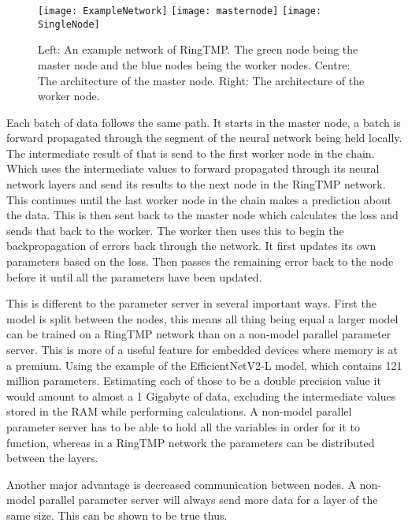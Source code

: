 \begin{figure}[h]
    \texttt{[image: ExampleNetwork]}
    \texttt{[image: masternode]}
    \texttt{[image: SingleNode]}
    \caption{Left: An example network of RingTMP. The green node being the
            master node and the blue nodes being the worker nodes. Centre: The
            architecture of the master node. Right: The architecture of the
            worker node.}
\end{figure}

Each batch of data follows the same path. It starts in the master node, a batch
is forward propagated through the segment of the neural network being held
locally. The intermediate result of that is send to the first worker node in the
chain. Which uses the intermediate values to forward propagated through its
neural network layers and send its results to the next node in the RingTMP
network. This continues until the last worker node in the chain makes a
prediction about the data. This is then sent back to the master node which
calculates the loss and sends that back to the worker. The worker then uses this
to begin the backpropagation of errors back through the network. It first
updates its own parameters based on the loss. Then passes the remaining
error back to the node before it until all the parameters have been updated.

This is different to the parameter server in several important ways. First the
model is split between the nodes, this means all thing being equal a larger
model can be trained on a RingTMP network than on a non-model parallel parameter
server. This is more of a useful feature for embedded devices where memory is at
a premium. Using the example of the EfficientNetV2-L model, which contains 121
million parameters. \cite{tan2021efficientnetv2} Estimating each of those to be
a double precision value it would amount to almost a 1 Gigabyte of data,
excluding the intermediate values stored in the RAM while performing
calculations. A non-model parallel parameter server has to be able to hold all
the variables in order for it to function, whereas in a RingTMP network the
parameters can be distributed between the layers.

Another major advantage is decreased communication between nodes. A non-model
parallel parameter server will always send more data for a
layer of the same size. This can be shown to be true thus.

